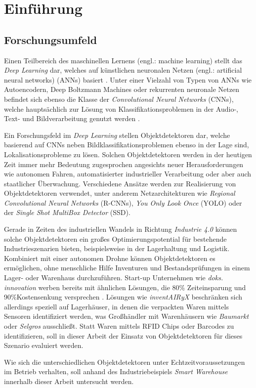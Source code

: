 \chapter{Einführung}

\section{Forschungsumfeld}

Einen Teilbereich des maschinellen Lernens (engl.: machine learning) stellt das \textit{Deep Learning} dar, welches auf künstlichen neuronalen Netzen (engl.: artificial neural networks) (ANNs) basiert \cite{AurelienGeron.2018}. Unter einer Vielzahl von Typen von ANNs wie Autoencodern, Deep Boltzmann Machines oder rekurrenten neuronale Netzen befindet sich ebenso die Klasse der \textit{Convolutional Neural Networks} (CNNs), welche hauptsächlich zur Lösung von Klassifikationsproblemen in der Audio-, Text- und Bildverarbeitung genutzt werden \cite{MathWorks.2019}.

Ein Forschungsfeld im \textit{Deep Learning} stellen Objektdetektoren dar, welche basierend auf CNNs neben Bildklassifikationsproblemen ebenso in der Lage sind, Lokalisationsprobleme zu lösen. Solchen Objektdetektoren werden in der heutigen Zeit immer mehr Bedeutung zugesprochen angesichts neuer Herausforderungen wie autonomen Fahren, automatisierter industrieller Verarbeitung oder aber auch staatlicher Überwachung. Verschiedene Ansätze werden zur Realisierung von Objektdetektoren verwendet, unter anderem Netzarchitekturen wie \textit{Regional Convolutional Neural Networks} (R-CNNs), \textit{You Only Look Once} (YOLO) oder der \textit{Single Shot MultiBox Detector} (SSD). 

Gerade in Zeiten des industriellen Wandels in Richtung \textit{Industrie 4.0} können solche Objektdetektoren ein großes Optimierungspotential für bestehende Industrieszenarien bieten, beispielsweise in der Lagerhaltung und Logistik. Kombiniert mit einer autonomen Drohne können Objektdetektoren es ermöglichen, ohne menschliche Hilfe Inventuren und Bestandsprüfungen in einem Lager- oder Warenhaus durchzuführen. Start-up Unternehmen wie \textit{doks. innovation} werben bereits mit ähnlichen Lösungen, die 80\% Zeiteinsparung und 90\%Kostensenkung versprechen \cite{doks.innovation.2019}. Lösungen wie \textit{inventAIRyX} beschränken sich allerdings speziell auf Lagerhäuser, in denen die verpackten Waren mittels Sensoren identifiziert werden, was Großhändler mit Warenhäusern wie \textit{Baumarkt} oder \textit{Selgros} ausschließt. Statt Waren mittels RFID Chips oder Barcodes zu identifizieren, soll in dieser Arbeit der Einsatz von Objektdetektoren für dieses Szenario evaluiert werden.

Wie sich die unterschiedlichen Objektdetektoren unter Echtzeitvoraussetzungen im Betrieb verhalten, soll anhand des Industriebeispiels \textit{Smart Warehouse} innerhalb dieser Arbeit untersucht werden. 

